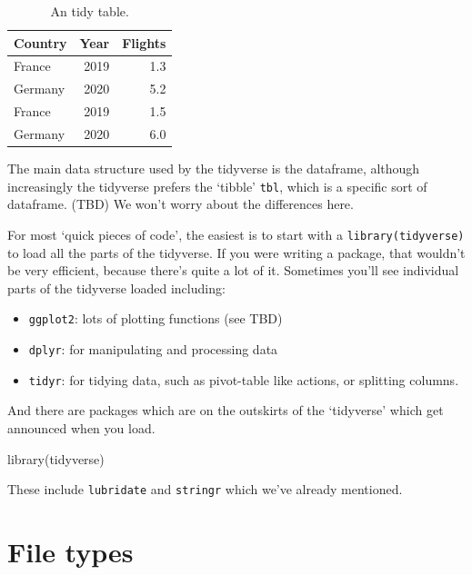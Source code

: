 \documentclass[
]{book}
\newenvironment{Shaded}{\begin{snugshade}}{\end{snugshade}}
\newcommand{\FunctionTok}[1]{\textcolor[rgb]{0.00,0.00,0.00}{#1}}
\newcommand{\NormalTok}[1]{#1}
\providecommand{\tightlist}{%
  \setlength{\itemsep}{0pt}\setlength{\parskip}{0pt}}
\begin{document}
\begin{table}

\caption{\label{tab:twotables}An tidy table.}
\centering
\begin{tabular}[t]{lrr}
\toprule
Country & Year & Flights\\
\midrule
France & 2019 & 1.3\\
Germany & 2020 & 5.2\\
France & 2019 & 1.5\\
Germany & 2020 & 6.0\\
\bottomrule
\end{tabular}
\end{table}

The main data structure used by the tidyverse is the dataframe, although increasingly the tidyverse prefers the `tibble' \texttt{tbl}, which is a specific sort of dataframe. (TBD) We won't worry about the differences here.

For most `quick pieces of code', the easiest is to start with a \texttt{library(tidyverse)} to load all the parts of the tidyverse. If you were writing a package, that wouldn't be very efficient, because there's quite a lot of it. Sometimes you'll see individual parts of the tidyverse loaded including:

\begin{itemize}
\tightlist
\item
  \texttt{ggplot2}: lots of plotting functions (see TBD)
\item
  \texttt{dplyr}: for manipulating and processing data
\item
  \texttt{tidyr}: for tidying data, such as pivot-table like actions, or splitting columns.
\end{itemize}

And there are packages which are on the outskirts of the `tidyverse' which get announced when you load.

\begin{Shaded}
\begin{Highlighting}[]
\FunctionTok{library}\NormalTok{(tidyverse)}
\end{Highlighting}
\end{Shaded}

These include \texttt{lubridate} and \texttt{stringr} which we've already mentioned.

\hypertarget{filetypes}{%
\section{File types}\label{filetypes}}
\end{document}
